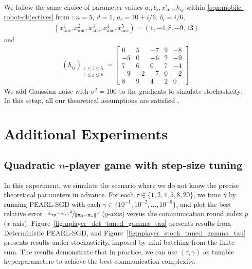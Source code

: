 \documentclass{article}
\newcommand{\algname}[1]{{\color{PineGreen}\sf  #1}\xspace}
\newcommand{\vx}{{\mathbf{x}}}
\newcommand{\abbvname}{\algname{PEARL-SGD}}
\theoremstyle{plain}
\theoremstyle{remark}
\begin{document}
We follow the same choice of parameter values $a_i, b_i, x^i_\mathrm{anc}, h_{ij}$ within \eqref{eqn:mobile-robot-objectives} from \citep{KalyvaPsillakis2024_distributed}: $n=5$, $d=1$, $a_i = 10 + i/6$, $b_i = i/6$, 
\begin{align*}
    \left( x^1_\mathrm{anc}, x^2_\mathrm{anc}, x^3_\mathrm{anc}, x^4_\mathrm{anc}, x^5_\mathrm{anc} \right) = (1, -4, 8, -9, 13)
\end{align*}
and
\begin{align*}
    \left( h_{ij} \right)_{\substack{1\le i\le 5 \\ 1 \le j\le 5}} = \begin{bmatrix}
        0 & 5 & -7 & 9 & -8 \\
        -5 & 0 & -6 & 2 & -9 \\
        7 & 6 & 0 & 7 & -4 \\
        -9 & -2 & -7 & 0 & -2 \\
        8 & 9 & 4 & 2 & 0
    \end{bmatrix} .
\end{align*}
We add Gaussian noise with $\sigma^2 = 100$ to the gradients to simulate stochasticity. 
In this setup, all our theoretical assumptions are satisfied \citep{KalyvaPsillakis2024_distributed}. 

\newpage

\section{Additional Experiments}
\label{section:additional-experiments}

\subsection{Quadratic $n$-player game with step-size tuning}
\label{subsection:n-player-tuning-experiment}

In this experiment, we simulate the scenario where we do not know the precise theoretical parameters in advance.
For each $\tau \in \{1, 2, 4, 5, 8, 20\}$, we tune $\gamma$ by running \abbvname with each $\gamma \in \{10^{-1}, 10^{-2}, \dots, 10^{-6}\}$, and plot the best relative error $\nicefrac{\|\vx_{\tau p} - \vx_\star\|^2}{\|\vx_0 - \vx_\star\|^2}$ ($y$-axis) versus the communication round index $p$ ($x$-axis). 
Figure~\ref{fig:nplayer_det_tuned_gamma_tau} presents results from Deterministic \abbvname, and Figure~\ref{fig:nplayer_stoch_tuned_gamma_tau} presents results under stochasticity, imposed by mini-batching from the finite sum.
The results demonstrate that in practice, we can use $(\tau, \gamma)$ as tunable hyperparameters to achieve the best communication complexity.
\end{document}
